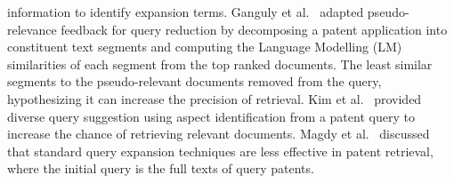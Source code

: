 information to identify expansion terms. Ganguly et
al.~\cite{ganguly2011patent} adapted pseudo-relevance feedback for
query reduction by decomposing a patent application into constituent
text segments and computing the Language Modelling (LM) similarities
of each segment from the top ranked documents. The least similar
segments to the pseudo-relevant documents removed from the query,
hypothesizing it can increase the precision of retrieval. Kim et
al.~\cite{kim2014diversifying} provided diverse query suggestion using
aspect identification from a patent query to increase the chance of
retrieving relevant documents. Magdy et al.~\cite{magdy2011study} 
discussed that standard query expansion techniques are
less effective in patent retrieval, where the initial query is the full texts of query
patents. 












